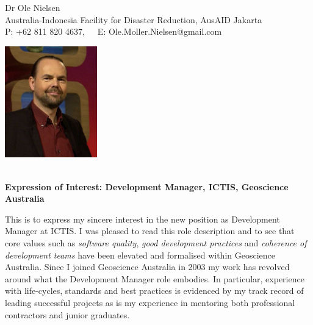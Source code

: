 \documentclass[10pt,a4paper]{article}
\begin{document}
\begin{center}
  Dr Ole Nielsen \\
  Australia-Indonesia Facility for Disaster Reduction, AusAID Jakarta \\
  P: +62 811 820 4637,\ \ \ E: Ole.Moller.Nielsen@gmail.com
\end{center}
\begin{center}
\includegraphics[width=40mm,keepaspectratio=true]{ole.jpg}
\end{center}


\begin{center}
  \hrulefill \\
  {\bf Expression of Interest: Development Manager, ICTIS, Geoscience Australia} \\[-0.2cm]
  \hrulefill
\end{center}

This is to express my sincere interest in the new position as Development Manager at ICTIS.
I was pleased to read this role description and to see that core values such as \emph{software quality}, \emph{good development practices} and \emph{coherence of development teams} have been elevated and formalised within Geoscience Australia.
Since I joined Geoscience Australia in 2003 my work has revolved around what the Development Manager role embodies. In particular, experience with life-cycles, standards and best practices is evidenced by my track record of leading successful projects as is my experience in mentoring both professional contractors and junior graduates.\\
\end{document}
